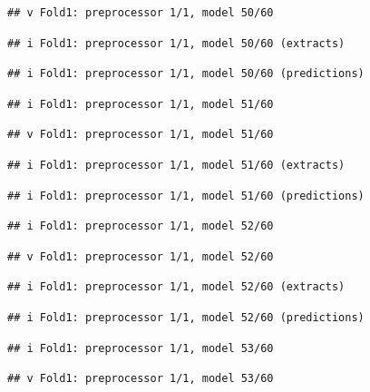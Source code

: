 \documentclass[
]{article}
\begin{document}
\begin{verbatim}
## v Fold1: preprocessor 1/1, model 50/60
\end{verbatim}

\begin{verbatim}
## i Fold1: preprocessor 1/1, model 50/60 (extracts)
\end{verbatim}

\begin{verbatim}
## i Fold1: preprocessor 1/1, model 50/60 (predictions)
\end{verbatim}

\begin{verbatim}
## i Fold1: preprocessor 1/1, model 51/60
\end{verbatim}

\begin{verbatim}
## v Fold1: preprocessor 1/1, model 51/60
\end{verbatim}

\begin{verbatim}
## i Fold1: preprocessor 1/1, model 51/60 (extracts)
\end{verbatim}

\begin{verbatim}
## i Fold1: preprocessor 1/1, model 51/60 (predictions)
\end{verbatim}

\begin{verbatim}
## i Fold1: preprocessor 1/1, model 52/60
\end{verbatim}

\begin{verbatim}
## v Fold1: preprocessor 1/1, model 52/60
\end{verbatim}

\begin{verbatim}
## i Fold1: preprocessor 1/1, model 52/60 (extracts)
\end{verbatim}

\begin{verbatim}
## i Fold1: preprocessor 1/1, model 52/60 (predictions)
\end{verbatim}

\begin{verbatim}
## i Fold1: preprocessor 1/1, model 53/60
\end{verbatim}

\begin{verbatim}
## v Fold1: preprocessor 1/1, model 53/60
\end{verbatim}
\end{document}
